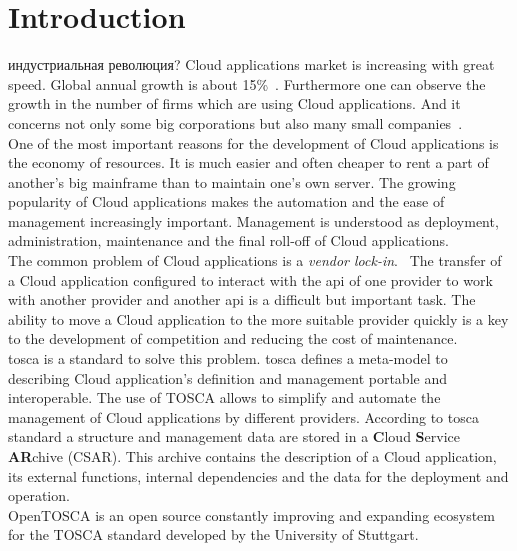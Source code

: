
\chapter{Introduction}
индустриальная революция?
\fi
Cloud applications market is increasing with great speed. 
Global annual growth is about 15\%~\cite*{statista_global}.
Furthermore one can observe the growth in the number of firms which are using Cloud applications. 
And it concerns not only some big corporations but also many small companies~\cite*{destatis_2014, destatis_2016}. \\ 
One of the most important reasons for the development of Cloud applications is the economy of resources.
It is much easier and often cheaper to rent a part of another's big mainframe than to maintain one's own server.
The growing popularity of Cloud applications makes the automation and the ease of management increasingly important.
Management is understood as deployment, administration, maintenance and the final roll-off of Cloud applications.~\cite*{autocloud} \\   
The common problem of Cloud applications is a \emph{vendor lock-in}.~\cite*{lockin} 
The transfer of a Cloud application configured to interact with the \gls{api} of one provider to work with another provider and another \gls{api} is a difficult but important task. 
The ability to move a Cloud application to the more suitable provider quickly is a key to the development of competition and reducing the cost of maintenance.\\ %
\gls{tosca} \cite*{TOSCA-v1.0} is a standard to solve this problem. 
\gls{tosca} defines a meta-model to describing Cloud application's definition and management portable and interoperable. 
The use of TOSCA allows to simplify and automate the management of Cloud applications by different providers. 
According to \gls{tosca} standard a structure and management data are stored in a \textbf{C}loud \textbf{S}ervice \textbf{AR}chive (CSAR).
This archive contains the description of a Cloud application, its external functions, internal dependencies and the data for the deployment and operation.\\
OpenTOSCA \cite*{OpenTOSCA} is an open source constantly improving and expanding ecosystem for the TOSCA standard developed by the University of Stuttgart.
